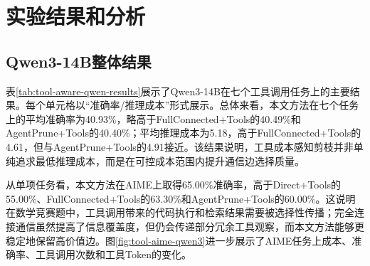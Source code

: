 \section{实验结果和分析}

\subsection{Qwen3-14B整体结果}

表\ref{tab:tool-aware-qwen-results}展示了Qwen3-14B在七个工具调用任务上的主要结果。每个单元格以``准确率/推理成本''形式展示。总体来看，本文方法在七个任务上的平均准确率为40.93\%，略高于FullConnected+Tools的40.49\%和AgentPrune+Tools的40.40\%；平均推理成本为5.18，高于FullConnected+Tools的4.61，但与AgentPrune+Tools的4.91接近。该结果说明，工具成本感知剪枝并非单纯追求最低推理成本，而是在可控成本范围内提升通信边选择质量。

\begin{table}[H]
  \centering
  \caption{Qwen3-14B下工具成本感知通信图剪枝结果（准确率\% / 推理成本）}
  \label{tab:tool-aware-qwen-results}
\end{table}

从单项任务看，本文方法在AIME上取得65.00\%准确率，高于Direct+Tools的55.00\%、FullConnected+Tools的63.30\%和AgentPrune+Tools的60.00\%。这说明在数学竞赛题中，工具调用带来的代码执行和检索结果需要被选择性传播；完全连接通信虽然提高了信息覆盖度，但仍会传递部分冗余工具观察，而本文方法能够更稳定地保留高价值边。图\ref{fig:tool-aime-qwen3}进一步展示了AIME任务上成本、准确率、工具调用次数和工具Token的变化。

